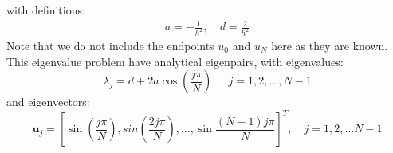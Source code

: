 \documentclass[american,a4paper,12pt]{article}
\renewcommand{\vec}[1]{\mathbf{#1}} %
\begin{document}
with definitions:
\begin{align*}
    a = -\frac{1}{h^2}, \quad d = \frac{2}{h^2}
\end{align*}
Note that we do not include the endpoints $u_0$ and $u_N$ here as they are known. This eigenvalue problem have analytical eigenpairs, with eigenvalues: 
\begin{equation}
    \lambda_j = d + 2a \cos{(\frac{j\pi}{N})}, \quad j = 1,2,\hdots, N-1
    \label{eq:analytical_eigvals}
\end{equation}
and eigenvectors:
\begin{equation}
    \vec{u}_j = [\sin{(\frac{j\pi}{N})}, sin(\frac{2j\pi}{N}), \hdots, \sin{\frac{(N-1)j\pi}{N}}]^T, \quad j = 1,2, \hdots N-1
    \label{eq:analytical_eigvecs}
\end{equation}
\cite{project_description}
\end{document}
